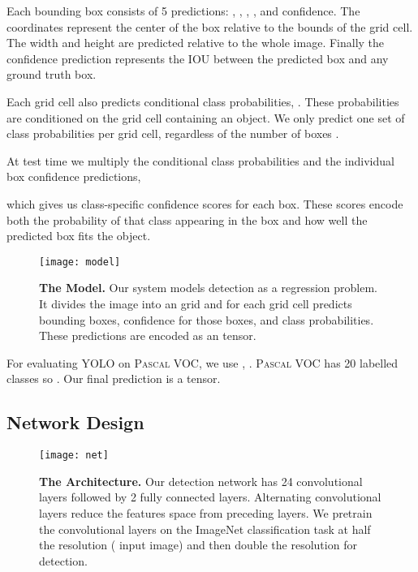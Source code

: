 \documentclass[10pt,twocolumn,letterpaper]{article}
\begin{document}
Each bounding box consists of 5 predictions: , , , , and confidence. The  coordinates represent the center of the box relative to the bounds of the grid cell. The width and height are predicted relative to the whole image. Finally the confidence prediction represents the IOU between the predicted box and any ground truth box.

Each grid cell also predicts  conditional class probabilities, . These probabilities are conditioned on the grid cell containing an object. We only predict one set of class probabilities per grid cell, regardless of the number of boxes .

At test time we multiply the conditional class probabilities and the individual box confidence predictions,

which gives us class-specific confidence scores for each box. These scores encode both the probability of that class appearing in the box and how well the predicted box fits the object.


\begin{figure}[h]
\begin{center}
    \texttt{[image: model]}
\end{center}
   \caption{\small \textbf{The Model.} Our system models detection as a regression problem. It divides the image into an  grid and for each grid cell predicts  bounding boxes, confidence for those boxes, and  class probabilities. These predictions are encoded as an  tensor.}
\label{model}
\end{figure}

For evaluating YOLO on \textsc{Pascal} VOC, we use , . \textsc{Pascal} VOC has 20 labelled classes so . Our final prediction is a  tensor.


\subsection{Network Design}

   \begin{figure*}[t]
      \centering
        \texttt{[image: net]}
      \caption{\small \textbf{The Architecture.} Our detection network has 24 convolutional layers followed by 2 fully connected layers. Alternating  convolutional layers reduce the features space from preceding layers. We pretrain the convolutional layers on the ImageNet classification task at half the resolution ( input image) and then double the resolution for detection.}
      \label{net}
   \end{figure*}
\end{document}
